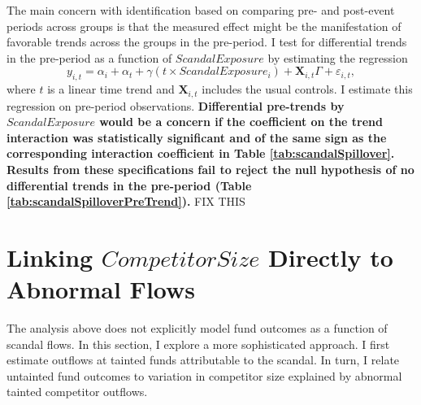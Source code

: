 \documentclass[openany]{book}
\theoremstyle{definition}
\theoremstyle{definition}
\theoremstyle{definition}
\theoremstyle{remark}
\begin{document}
The main concern with identification based on comparing pre- and
post-event periods across groups is that the measured effect might be
the manifestation of favorable trends across the groups in the
pre-period. I test for differential trends in the pre-period as a
function of \(ScandalExposure\) by estimating the regression
\begin{equation}
y_{i,t} = \alpha_i + \alpha_t + \gamma \left(t \times ScandalExposure_i\right) + \mathbf{X}_{i,t}\Gamma + \varepsilon_{i,t},
\end{equation} where \(t\) is a linear time trend and
\(\mathbf{X}_{i,t}\) includes the usual controls. I estimate this
regression on pre-period observations. \textbf{Differential pre-trends
by \(ScandalExposure\) would be a concern if the coefficient on the
trend interaction was statistically significant and of the same sign as
the corresponding interaction coefficient in Table
\ref{tab:scandalSpillover}. Results from these specifications fail to
reject the null hypothesis of no differential trends in the pre-period
(Table \ref{tab:scandalSpilloverPreTrend}).} FIX THIS

\hypertarget{sec:linkFlows}{%
\section{\texorpdfstring{Linking \(CompetitorSize\) Directly to Abnormal
Flows}{Linking CompetitorSize Directly to Abnormal Flows}}\label{sec:linkFlows}}

The analysis above does not explicitly model fund outcomes as a function
of scandal flows. In this section, I explore a more sophisticated
approach. I first estimate outflows at tainted funds attributable to the
scandal. In turn, I relate untainted fund outcomes to variation in
competitor size explained by abnormal tainted competitor outflows.
\end{document}
